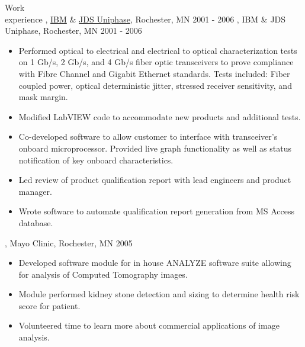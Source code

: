 \begin{category}{Work \\experience}
\ifWebLinks
{}, \href{http://www.ibm.com}{IBM} \& \href{http://www.jdsu.com}{JDS Uniphase}, Rochester, MN  2001 - 2006 
\else
{}, IBM \& JDS Uniphase, Rochester, MN  2001 - 2006 
\fi

\begin{itemize}
\item Performed optical to electrical and electrical to optical characterization tests on 1 Gb/s, 2 Gb/s, and 4 Gb/s fiber optic transceivers to prove compliance with Fibre Channel and Gigabit Ethernet standards. Tests included: Fiber coupled power, optical deterministic jitter, stressed receiver sensitivity, and mask margin.
\item Modified LabVIEW code to accommodate new products and additional tests.
\item Co-developed software to allow customer to interface with transceiver's onboard microprocessor. Provided live graph functionality as well as status notification of key onboard characteristics.
\item Led review of product qualification report with lead engineers and product manager.
\item Wrote software to automate qualification report generation from MS Access database.
\end{itemize}


, Mayo Clinic, Rochester, MN  2005 
\begin{itemize}
\item Developed software module for in house ANALYZE software suite allowing for analysis of Computed Tomography images. 
\item Module performed kidney stone detection and sizing to determine health risk score for patient.
\item Volunteered time to learn more about commercial applications of image analysis. 
\end{itemize}



\end{category}
